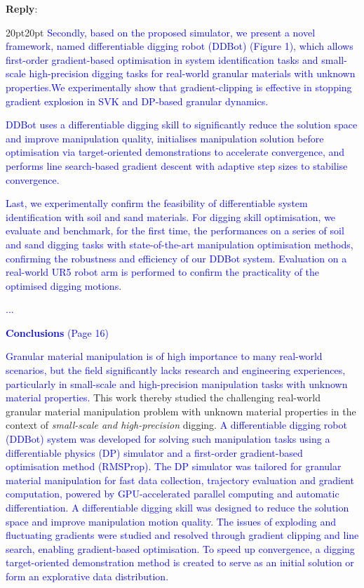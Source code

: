 \documentclass[11pt]{article}
\newenvironment{reply}
   {\medskip \noindent \begin{sf}\textbf{Reply}: \  }
   {\medskip \end{sf}}
\newcommand{\xt}[1]{\textcolor{blue}{#1}}
\begin{document}
\begin{reply}
\begin{adjustwidth}{20pt}{20pt}
\xt{Secondly, based on the proposed simulator, we present a novel framework, named differentiable digging robot (DDBot) (Figure 1), which allows first-order gradient-based optimisation in system identification tasks and small-scale high-precision digging tasks for real-world granular materials with unknown properties.We experimentally show that gradient-clipping is effective in stopping gradient explosion in SVK and DP-based granular dynamics.} 

\xt{DDBot uses a differentiable digging skill to significantly reduce the solution space and improve manipulation quality, initialises manipulation solution before optimisation via target-oriented demonstrations to accelerate convergence, and performs line search-based gradient descent with adaptive step sizes to stabilise convergence.}

\xt{Last, we experimentally confirm the feasibility of differentiable system identification with soil and sand materials. For digging skill optimisation, we evaluate and benchmark, for the first time, the performances on a series of soil and sand digging tasks with state-of-the-art manipulation optimisation methods, confirming the robustness and efficiency of our DDBot system. Evaluation on a real-world UR5 robot arm is performed to confirm the practicality of the optimised digging motions.}

\xt{...}

\vspace{0.3cm}\noindent\xt{\textbf{Conclusions} (Page 16)}

\xt{Granular material manipulation is of high importance to many real-world scenarios, but the field significantly lacks research and engineering experiences, particularly in small-scale and high-precision manipulation tasks with unknown material properties.} This work thereby studied the challenging real-world granular material manipulation problem with unknown material properties in the context of \textit{small-scale and high-precision} digging. \xt{A differentiable digging robot (DDBot) system was developed for solving such manipulation tasks using a differentiable physics (DP) simulator and a first-order gradient-based optimisation method (RMSProp). The DP simulator was tailored for granular material manipulation for fast data collection, trajectory evaluation and gradient computation, powered by GPU-accelerated parallel computing and automatic differentiation. A differentiable digging skill was designed to reduce the solution space and improve manipulation motion quality. The issues of exploding and fluctuating gradients were studied and resolved through gradient clipping and line search, enabling gradient-based optimisation. To speed up convergence, a digging target-oriented demonstration method is created to serve as an initial solution or form an explorative data distribution.}


\end{adjustwidth}
\end{reply}
\end{document}

